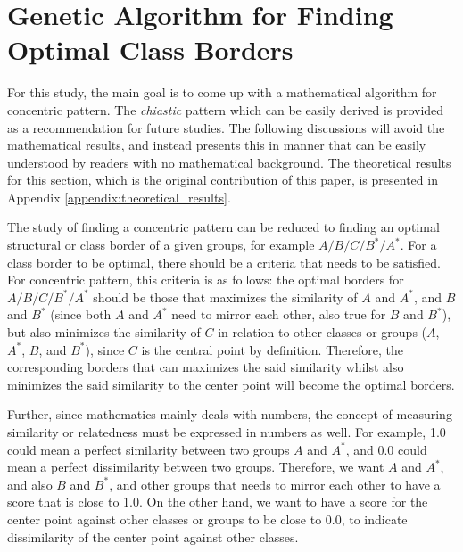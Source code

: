 \section{Genetic Algorithm for Finding Optimal Class Borders}\label{sec:result_ga}
For this study, the main goal is to come up with a mathematical algorithm for concentric pattern. The \textit{chiastic} pattern which can be easily derived is provided as a recommendation for future studies. The following discussions will avoid the mathematical results, and instead presents this in manner that can be easily understood by readers with no mathematical background. The theoretical results for this section, which is the original contribution of this paper, is presented in Appendix \ref{appendix:theoretical_results}.

The study of finding a concentric pattern can be reduced to finding an optimal structural or class border of a given groups, for example $A/B/C/B^*/A^*$. For a class border to be optimal, there should be a criteria that needs to be satisfied. For concentric pattern, this criteria is as follows: the optimal borders for $A/B/C/B^*/A^*$ should be those that maximizes the similarity of $A$ and $A^*$, and $B$ and $B^*$ (since both $A$ and $A^*$ need to mirror each other, also true for $B$ and $B^*$), but also minimizes the similarity of $C$ in relation to other classes or groups ($A$, $A^*$, $B$, and $B^*$), since $C$ is the central point by definition. Therefore, the corresponding borders that can maximizes the said similarity whilst also minimizes the said similarity to the center point will become the optimal borders. 

Further, since mathematics mainly deals with numbers, the concept of measuring similarity or relatedness must be expressed in numbers as well. For example, 1.0 could mean a perfect similarity between two groups $A$ and $A^*$, and 0.0 could mean a perfect dissimilarity between two groups. Therefore, we want $A$ and $A^*$, and also $B$ and $B^*$, and other groups that needs to mirror each other to have a score that is close to 1.0. On the other hand, we want to have a score for the center point against other classes or groups to be close to 0.0, to indicate dissimilarity of the center point against other classes.

